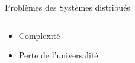 \documentclass[presentation]{beamer}
\begin{document}
\begin{frame}[label={sec:orgb2a19c2}]{Problèmes des Systèmes distribués}
\begin{columns}
\begin{column}{0.60\columnwidth}
\begin{block}{}
\begin{itemize}
\item <1> Complexité
\item <2> Perte de \alert{l'universalité}
\end{itemize}
\begin{block}{}
\end{block}
\end{block}
\end{column}

\begin{column}{0.40\columnwidth}
\begin{block}{}
\end{block}
\end{column}
\end{columns}
\end{frame}
\end{document}
